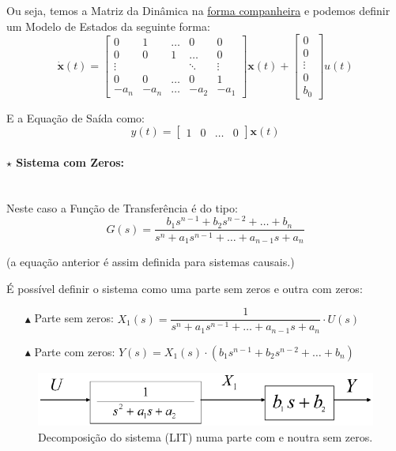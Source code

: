 \noindent Ou seja, temos a Matriz da Dinâmica na \underline{forma companheira} e podemos definir um Modelo de Estados da seguinte forma:
$$
    \dot{\pmb{x}}(t) = 
    \begin{bmatrix} 
        0 & 1 & \dots & 0 & 0\\
        0 & 0 & 1 & \dots & 0\\
        \vdots &  &  & \ddots & \vdots\\
        0 & 0 & \dots & 0 & 1\\
        -a_n & -a_n & \dots & -a_2 & -a_1 
    \end{bmatrix} \pmb{x}(t) 
    + 
    \begin{bmatrix} 
        0\\
        0\\
        \vdots\\
        0\\
        b_0
    \end{bmatrix}
    u(t)
$$

\noindent E a Equação de Saída como:
$$
    y(t) = 
    \begin{bmatrix}
        1 & 0 & \dots & 0    
    \end{bmatrix}
    \pmb{x}(t)
$$

\paragraph[1.1.3 b) Sistema com Zeros]{$\pmb{\star}$ Sistema com Zeros:}\mbox{}\\
Neste caso a Função de Transferência é do tipo:
$$
    G(s) = \frac{b_1 s^{n-1} + b_2 s^{n-2} + \dots + b_n}{s^n + a_1 s^{n-1} + \dots + a_{n-1} s + a_n}
$$

\noindent (a equação anterior é assim definida para sistemas causais.)

É possível definir o sistema como uma parte sem zeros e outra com zeros:
\begin{enumerate}
    \item[$\blacktriangle$] Parte sem zeros: $X_1(s) = \dfrac{1}{s^n + a_1 s^{n-1} + \dots + a_{n-1} s + a_n}\cdot U(s)$
    \item[$\blacktriangle$] Parte com zeros: $Y(s) = X_1(s) \cdot (b_1 s^{n-1} + b_2 s^{n-2} + \dots + b_n)$
\end{enumerate}

\begin{figure}[H]
    \centering
    \includegraphics[width = 0.85\linewidth]{img/state-space-models/transfer-decomposition.png}
    \caption{Decomposição do sistema (LIT) numa parte com e noutra sem zeros.}
    \label{fig:transfer-decomposition}
\end{figure}

